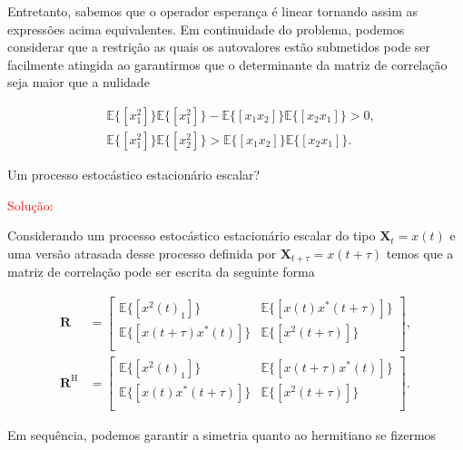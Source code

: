         Entretanto, sabemos que o operador esperança é linear tornando assim as expressões acima equivalentes. Em continuidade do problema, podemos 
        considerar que a restrição as quais os autovalores estão submetidos pode ser facilmente atingida ao garantirmos que o determinante da matriz 
        de correlação seja maior que a nulidade
        
        \begin{align}
            &\mathbb{E}\{[x^{2}_{1}]\} \mathbb{E}\{[x^{2}_{1}]\} - \mathbb{E}\{[x_{1}x_{2}]\} \mathbb{E}\{[x_{2}x_{1}]\} > 0, \\
            &\mathbb{E}\{[x_{1}^{2}]\} \mathbb{E}\{[x^{2}_{2}]\} > \mathbb{E}\{[x_{1}x_{2}]\} \mathbb{E}\{[x_{2}x_{1}]\}.
        \end{align}

     Um processo estocástico estacionário escalar?
    
        \textcolor{red}{Solução:}
        
        Considerando um processo estocástico estacionário escalar do tipo $\mathbf{X}_{t} = x(t)$ e uma versão atrasada desse
        processo definida por $\mathbf{X}_{t + \tau} = x(t + \tau)$ temos que a matriz de correlação pode ser escrita da seguinte forma
        
        \begin{align}
            \mathbf{R} &= \left[ 
            \begin{matrix}
                \mathbb{E}\{[x^{2}(t)_{1}]\} & \mathbb{E}\{[x(t)x^{*}(t + \tau)]\} \\
                \mathbb{E}\{[x(t + \tau)x^{*}(t)]\} & \mathbb{E}\{[x^{2}(t + \tau)]\} \\
            \end{matrix} \right], \\
            \mathbf{R}^{\text{H}} &= \left[ 
            \begin{matrix}
                \mathbb{E}\{[x^{2}(t)_{1}]\} & \mathbb{E}\{[x(t + \tau)x^{*}(t)]\} \\
                \mathbb{E}\{[x(t)x^{*}(t + \tau)]\} & \mathbb{E}\{[x^{2}(t + \tau)]\} \\
            \end{matrix} \right].
        \end{align}
        
        
        Em sequência, podemos garantir a simetria quanto ao hermitiano se fizermos 
        
